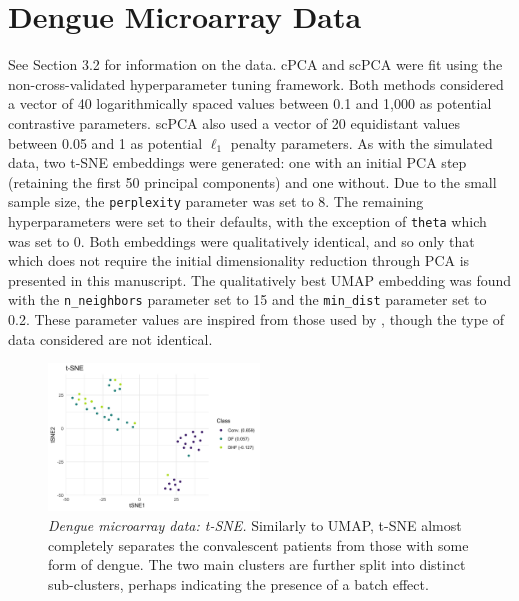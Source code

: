 \documentclass{article}
\begin{document}
\FloatBarrier

\section{Dengue Microarray Data}\label{sup_dengue}

See Section 3.2 %
for information on the data. cPCA and scPCA were fit using the non-cross-validated hyperparameter tuning framework. Both methods considered a vector of 40 logarithmically spaced values between 0.1 and 1,000 as potential contrastive parameters. scPCA also used a vector of 20 equidistant values between 0.05 and 1 as potential $\ell_1$ penalty parameters. As with the simulated data, two t-SNE embeddings were generated: one with an initial PCA step (retaining the first 50 principal components) and one without. Due to the small sample size, the \texttt{perplexity} parameter was set to 8. The remaining hyperparameters were set to their defaults, with the exception of \texttt{theta} which was set to 0. Both embeddings were qualitatively identical, and so only that which does not require the initial dimensionality reduction through PCA is presented in this manuscript. The qualitatively best UMAP embedding was found with the \texttt{n\_neighbors} parameter set to 15 and the \texttt{min\_dist} parameter set to 0.2. These parameter values are inspired from those used by \citet{Becht2019}, though the type of data considered are not identical.

\begin{figure}[!htbp]
    \centering
    \includegraphics[width=0.5\textwidth]{figures/dengue_tsne}
    \caption{
    {\em Dengue microarray data: t-SNE.}
    Similarly to UMAP, t-SNE almost completely separates the convalescent patients from those with some form of dengue. The two main clusters are further split into distinct sub-clusters, perhaps indicating the presence of a batch effect. 
    }
    \label{fig:dengue_tsne}
\end{figure}
\end{document}
